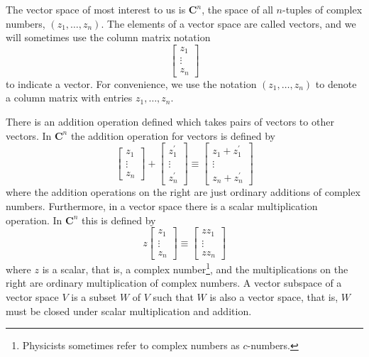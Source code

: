 \documentclass[
	11pt, %
	fleqn, %
	a4paper, %
]{LegrandOrangeBook}
\begin{document}
The vector space of most interest to us is $\mathbf{C}^{n}$, the space of all $n$-tuples of complex numbers, $\left(z_{1}, \ldots, z_{n}\right)$. The elements of a vector space are called vectors, and we will sometimes use the column matrix notation
$$
\left[\begin{array}{c}
z_{1} \\
\vdots \\
z_{n}
\end{array}\right]
$$
to indicate a vector. For convenience, we use the notation $\left(z_{1}, \ldots, z_{n}\right)$ to denote a column matrix with entries $z_{1}, \ldots, z_{n}$. 

There is an addition operation defined which takes pairs of vectors to other vectors. In $\mathbf{C}^{n}$ the addition operation for vectors is defined by
$$
\left[\begin{array}{c}
z_{1} \\
\vdots \\
z_{n}
\end{array}\right]+\left[\begin{array}{c}
z_{1}^{\prime} \\
\vdots \\
z_{n}^{\prime}
\end{array}\right] \equiv\left[\begin{array}{c}
z_{1}+z_{1}^{\prime} \\
\vdots \\
z_{n}+z_{n}^{\prime}
\end{array}\right]
$$
where the addition operations on the right are just ordinary additions of complex numbers. Furthermore, in a vector space there is a scalar multiplication operation. In $\mathbf{C}^{n}$ this is defined by
$$
z\left[\begin{array}{c}
z_{1} \\
\vdots \\
z_{n}
\end{array}\right] \equiv\left[\begin{array}{c}
z z_{1} \\
\vdots \\
z z_{n}
\end{array}\right]
$$
where $z$ is a scalar, that is, a complex number\footnote{Physicists sometimes refer to complex numbers as $c$-numbers.}, and the multiplications on the right are ordinary multiplication of complex numbers. A vector subspace of a vector space $V$ is a subset $W$ of $V$ such that $W$ is also a vector space, that is, $W$ must be closed under scalar multiplication and addition.
\end{document}
